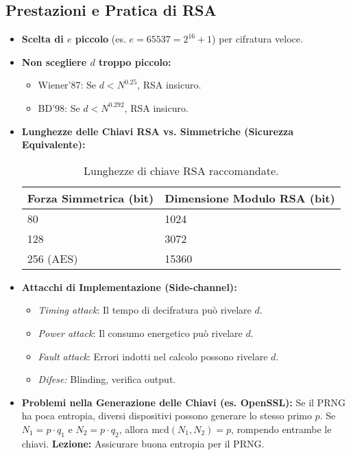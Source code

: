 \subsection{Prestazioni e Pratica di RSA}
\begin{itemize}
    \item \textbf{Scelta di $e$ piccolo} (es. $e=65537 = 2^{16}+1$) per cifratura veloce.
    \item \textbf{Non scegliere $d$ troppo piccolo:}
    \begin{itemize}
        \item Wiener'87: Se $d < N^{0.25}$, RSA insicuro.
        \item BD'98: Se $d < N^{0.292}$, RSA insicuro.
    \end{itemize}
    \item \textbf{Lunghezze delle Chiavi RSA vs. Simmetriche (Sicurezza Equivalente):}
    \begin{table}[H]
        \centering
        \begin{tabular}{|l|l|}
            \hline
            \textbf{\sffamily Forza Simmetrica (bit)} & \textbf{\sffamily Dimensione Modulo RSA (bit)} \\ \hline \hline
            80                               & 1024                              \\ \hline
            128                              & 3072                              \\ \hline
            256 (AES)                        & 15360                             \\ \hline
        \end{tabular}
        \caption{Lunghezze di chiave RSA raccomandate.}
        \label{tab:rsa_keys}
    \end{table}
    \item \textbf{Attacchi di Implementazione (Side-channel):}
    \begin{itemize}
        \item \textit{Timing attack}: Il tempo di decifratura può rivelare $d$.
        \item \textit{Power attack}: Il consumo energetico può rivelare $d$.
        \item \textit{Fault attack}: Errori indotti nel calcolo possono rivelare $d$.
        \item \textit{Difese:} Blinding, verifica output.
    \end{itemize}
    \item \textbf{Problemi nella Generazione delle Chiavi (es. OpenSSL):}
    Se il PRNG ha poca entropia, diversi dispositivi possono generare lo stesso primo $p$.
    Se $N_1 = p \cdot q_1$ e $N_2 = p \cdot q_2$, allora $\text{mcd}(N_1, N_2) = p$, rompendo entrambe le chiavi.
    \textbf{Lezione:} Assicurare buona entropia per il PRNG.
\end{itemize}

